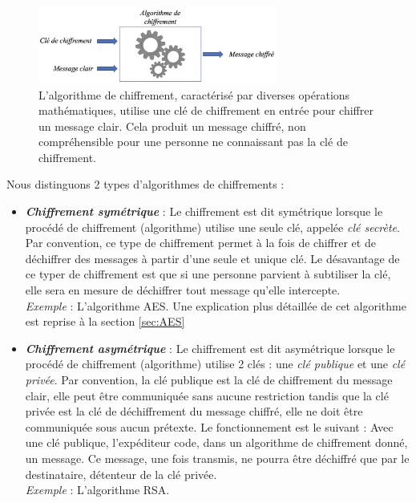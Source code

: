\documentclass[10pt, oneside, a4paper]{article}
\begin{document}
\begin{figure}[htbp]
    \centering
    \includegraphics[width=0.7\textwidth]{image/chiffrement}
    \caption{L'algorithme de chiffrement, caractérisé par diverses opérations mathématiques, utilise une clé de chiffrement en entrée pour chiffrer un message clair. Cela produit un message chiffré, non compréhensible pour une personne ne connaissant pas la clé de chiffrement.}
    \label{fig:chiffrement}
\end{figure}

\newpage

Nous distinguons 2 types d'algorithmes de chiffrements : 
\begin{itemize}
\item \textbf{\textit{Chiffrement symétrique}} : Le chiffrement est dit symétrique lorsque le procédé de chiffrement (algorithme) utilise une seule clé, appelée \textit{clé secrète}. Par convention, ce type de chiffrement permet à la fois de chiffrer et de déchiffrer des messages à partir d'une seule et unique clé. Le désavantage de ce typer de chiffrement est que si une personne parvient à subtiliser la clé, elle sera en mesure de déchiffrer tout message qu'elle intercepte.  \\
\textit{Exemple} : L'algorithme AES. Une explication plus détaillée de cet algorithme est reprise à la section \ref{sec:AES}
\item \textbf{\textit{Chiffrement asymétrique}} : Le chiffrement est dit asymétrique lorsque le procédé de chiffrement (algorithme) utilise 2 clés : une \textit{clé publique} et une \textit{clé privée}. Par convention, la clé publique est la clé de chiffrement du message clair, elle peut être communiquée sans aucune restriction tandis que la clé privée est la clé de déchiffrement du message chiffré, elle ne doit être communiquée sous aucun prétexte. Le fonctionnement est le suivant : Avec une clé publique, l'expéditeur code, dans un algorithme de chiffrement donné, un message. Ce message, une fois transmis, ne pourra être déchiffré que par le destinataire, détenteur de la clé privée. \\
\textit{Exemple} : L'algorithme RSA. \\
\end{itemize}
\end{document}
